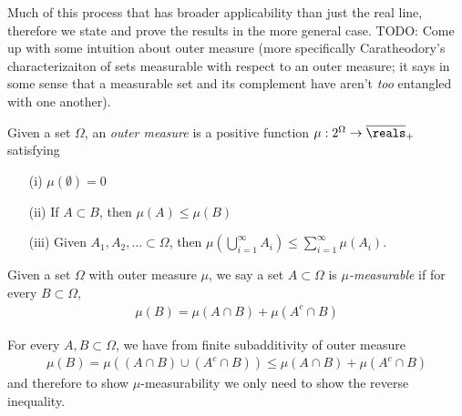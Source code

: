 Much of this process that has broader applicability than just the real line,  therefore we state and prove the results
in the more general case.
TODO: Come up with some intuition about outer measure (more
specifically Caratheodory's characterizaiton of sets measurable with
respect to an outer measure; it says in some sense that a measurable
set and its complement have aren't \emph{too} entangled with one another).
\begin{defn}Given a set $\Omega$, an \emph{outer measure} is a
positive  function $\mu : 2^\Omega \to \overline{\reals}_+$ satisfying
\begin{itemize}
\item[(i)] $\mu(\emptyset) = 0$
\item[(ii)] If $A \subset B$, then $\mu(A) \leq \mu(B)$
\item[(iii)] Given $A_1, A_2, \dots \subset \Omega$, then $\mu \left
    (\bigcup_{i=1}^\infty A_i \right ) \leq \sum_{i=1}^\infty \mu(A_i)$.
\end{itemize}
\end{defn}

\begin{defn}Given a set $\Omega$ with outer measure $\mu$, we say a
  set $A \subset \Omega$ is $\mu$\emph{-measurable} if for every $B
  \subset \Omega$,
\begin{align*}
\mu(B) = \mu(A \cap B) + \mu(A^c \cap B)
\end{align*}
\end{defn}

\begin{rem}For every $A,B \subset \Omega$, we have from finite
  subadditivity of outer measure
\begin{align*}
\mu(B) = \mu((A \cap B) \cup (A^c \cap B)) \leq \mu(A \cap B) + \mu(A^c \cap B)
\end{align*}
and therefore to show $\mu$-measurability we only need to show the
reverse inequality.
\end{rem}

